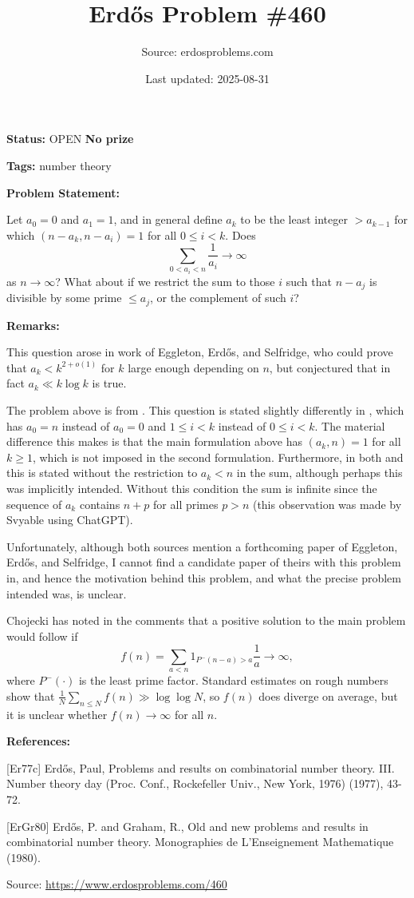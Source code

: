 \documentclass{article}
\title{Erd\H{o}s Problem \#460}
\date{Last updated: 2025-08-31}
\author{Source: erdosproblems.com}
\begin{document}
\maketitle

\noindent\textbf{Status:} OPEN \quad \textbf{No prize}

\noindent\textbf{Tags:} number theory

\medskip
\noindent\textbf{Problem Statement:}

Let $a_0=0$ and $a_1=1$, and in general define $a_k$ to be the least integer $>a_{k-1}$ for which $(n-a_k,n-a_i)=1$ for all $0\leq i<k$. Does\[\sum_{0<a_i< n}\frac{1}{a_i}\to \infty\]as $n\to \infty$? What about if we restrict the sum to those $i$ such that $n-a_j$ is divisible by some prime $\leq a_j$, or the complement of such $i$?

\bigskip
\noindent\textbf{Remarks:}

This question arose in work of Eggleton, Erd\H{o}s, and Selfridge, who could prove that $a_k <k^{2+o(1)}$ for $k$ large enough depending on $n$, but conjectured that in fact $a_k\ll k\log k$ is true.

The problem above is from \cite{Er77c}. This question is stated slightly differently in \cite{ErGr80}, which has $a_0=n$ instead of $a_0=0$ and $1\leq i<k$ instead of $0\leq i<k$. The material difference this makes is that the main formulation above has $(a_k,n)=1$ for all $k\geq 1$, which is not imposed in the second formulation. Furthermore, in both \cite{Er77c} and \cite{ErGr80} this is stated without the restriction to $a_k<n$ in the sum, although perhaps this was implicitly intended. Without this condition the sum is infinite since the sequence of $a_k$ contains $n+p$ for all primes $p>n$ (this observation was made by Svyable using ChatGPT).

Unfortunately, although both sources mention a forthcoming paper of Eggleton, Erd\H{o}s, and Selfridge, I cannot find a candidate paper of theirs with this problem in, and hence the motivation behind this problem, and what the precise problem intended was, is unclear.

Chojecki has noted in the comments that a positive solution to the main problem would follow if\[f(n) = \sum_{a<n}1_{P^-(n-a)>a}\frac{1}{a}\to \infty,\]where $P^-(\cdot)$ is the least prime factor. Standard estimates on rough numbers show that $\frac{1}{N}\sum_{n\leq N}f(n)\gg \log\log N$, so $f(n)$ does diverge on average, but it is unclear whether $f(n)\to \infty$ for all $n$.

\bigskip
\noindent\textbf{References:}

[Er77c] Erd\H{o}s, Paul, Problems and results on combinatorial number theory. III. Number theory day (Proc. Conf., Rockefeller Univ.,
New York, 1976) (1977), 43-72.
 
 [ErGr80] Erd\H{o}s, P. and Graham, R., Old and new problems and results in combinatorial number theory. Monographies de L'Enseignement Mathematique (1980).

\bigskip
\noindent\small{Source: \url{https://www.erdosproblems.com/460}}
\end{document}
